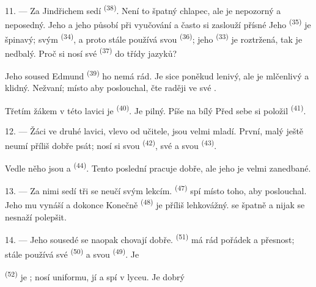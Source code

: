 11. --- Za Jindřichem sedí  \textsuperscript{(38)}. Není to špatný chlapec, ale
je  nepozorný a neposedný. Jeho  a jeho
 působí  při vyučování a často si zaslouží přísné
 Jeho  \textsuperscript{(35)} je špinavý;
 svým  \textsuperscript{(34)}, a proto
stále používá svou  \textsuperscript{(36)}; jeho 
\textsuperscript{(33)} je roztržená, tak je nedbalý. Proč si nosí své 
\textsuperscript{(37)} do třídy
 jazyků?

Jeho soused Edmund \textsuperscript{(39)} ho nemá rád. Je sice poněkud lenivý, ale je
mlčenlivý a klidný. Nežvaní; místo aby poslouchal, čte raději  ve své
.

Třetím žákem v této lavici je  \textsuperscript{(40)}. Je pilný. Píše na bílý
 Před sebe si položil  \textsuperscript{(41)}.

12. --- Žáci ve druhé lavici, vlevo od učitele, jsou velmi mladí. První, malý
 ještě neumí příliš dobře psát; nosí si svou  \textsuperscript{(42)}, své  a svou 
\textsuperscript{(43)}.

Vedle něho jsou  a  \textsuperscript{(44)}. Tento poslední
pracuje dobře, ale jeho  je velmi zanedbané.

13. --- Za nimi sedí tři  se neučí svým lekcím.
 \textsuperscript{(47)} spí místo toho, aby poslouchal. Jeho
 mu vynáší  a dokonce  Konečně
 \textsuperscript{(48)} je příliš lehkovážný.  se
špatně a nijak se nesnaží polepšit.

14. --- Jeho sousedé se naopak chovají dobře.  \textsuperscript{(51)} má rád
pořádek a přesnost; stále používá své
 \textsuperscript{(50)} a svou 
\textsuperscript{(49)}. Je 

 \textsuperscript{(52)} je ; nosí uniformu, jí a
spí v lyceu. Je dobrý 

